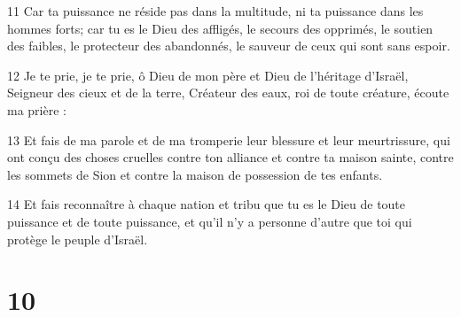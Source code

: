 \par 11 Car ta puissance ne réside pas dans la multitude, ni ta puissance dans les hommes forts; car tu es le Dieu des affligés, le secours des opprimés, le soutien des faibles, le protecteur des abandonnés, le sauveur de ceux qui sont sans espoir.
\par 12 Je te prie, je te prie, ô Dieu de mon père et Dieu de l'héritage d'Israël, Seigneur des cieux et de la terre, Créateur des eaux, roi de toute créature, écoute ma prière :
\par 13 Et fais de ma parole et de ma tromperie leur blessure et leur meurtrissure, qui ont conçu des choses cruelles contre ton alliance et contre ta maison sainte, contre les sommets de Sion et contre la maison de possession de tes enfants.
\par 14 Et fais reconnaître à chaque nation et tribu que tu es le Dieu de toute puissance et de toute puissance, et qu'il n'y a personne d'autre que toi qui protège le peuple d'Israël.

\chapter{10}

